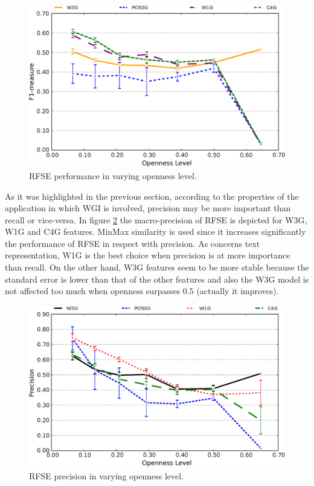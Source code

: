 \begin{figure}[t]
\begin{center}
    \includegraphics[scale=0.45]{Figures/RFSE_MIX_openness_test_graph.eps}
	\caption{RFSE performance in varying openness level.}
	\label{chap:noise:fig:RFSE_openness_test}
\end{center}
\end{figure}


As it was highlighted in the previous section, according to the properties of the application in which WGI is involved, precision may be more important than recall or vice-versa. In figure \ref{chap:noise:fig:RFSE_precision_focus_openness_test} the macro-precision of RFSE is depicted for W3G, W1G and C4G features. MinMax similarity is used since it increases significantly the performance of RFSE in respect with precision. As concerns text representation, W1G is the best choice when precision is at more importance than recall. On the other hand, W3G features seem to be more stable because the standard error is lower than that of the other features and also the W3G model is not affected too much when openness surpasses $0.5$ (actually it improves).

\begin{figure}[t]
\begin{center}
    \includegraphics[scale=0.45]{Figures/RFSE_Precision_Focus_openness_test_graph.eps}
	\caption{RFSE precision in varying openness level.}
	\label{chap:noise:fig:RFSE_precision_focus_openness_test}
\end{center}
\end{figure}

